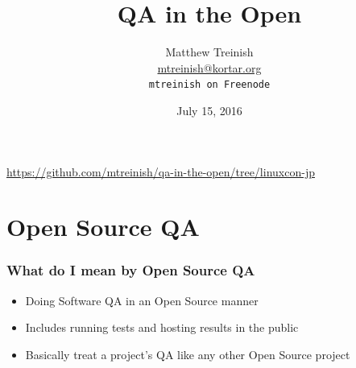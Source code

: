 \documentclass[aspectratio=43,11pt,hyperref={colorlinks=true}]{beamer}
\author[Matthew Treinish]{%
    \texorpdfstring{%
        \centering
        Matthew Treinish\\
        \href{mailto:mtreinish@kortar.org}{mtreinish@kortar.org}\\
        \texttt{mtreinish on Freenode}
   }
   {Matthew Treinish}
}
\date{July 15, 2016}
\title[QA in the Open
\hspace{2em}\insertframenumber/\inserttotalframenumber]{QA in the Open}
\begin{document}
{%
\begin{frame}[noframenumbering]
    \hypersetup{colorlinks,urlcolor=white}
    \titlepage{}
    \centering
    \href{https://github.com/mtreinish/qa-in-the-open/tree/linuxcon-jp}{https://github.com/mtreinish/qa-in-the-open/tree/linuxcon-jp}
\end{frame}
}

\section{Open Source QA}
\begin{frame}
    \frametitle{What do I mean by Open Source QA}
    \begin{itemize}
        \item Doing Software QA in an Open Source manner
        \item Includes running tests and hosting results in the public
        \item Basically treat a project's QA like any other Open Source project
    \end{itemize}
\end{frame}
\end{document}
